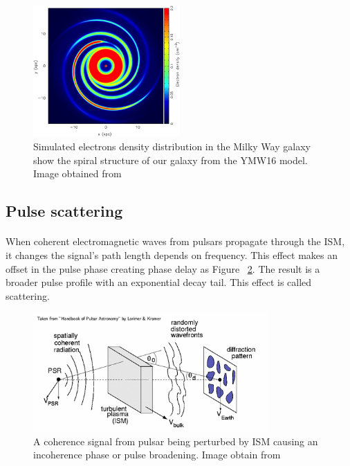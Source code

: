 \documentclass[thesis_msc.tex]{subfiles}
\begin{document}
\begin{figure}[h]
\centering
\includegraphics[width=0.5\textwidth]{figures/nedist.jpg}
\caption{Simulated electrons density distribution in the Milky Way galaxy show the spiral structure of our galaxy from the YMW16 model. Image obtained from \citep{yao2017new}  }
\label{nedist}
\end{figure}

    
    \subsection{Pulse scattering}
\paragraph{} When coherent electromagnetic waves from pulsars propagate through the ISM, it changes the signal's path length depends on frequency. This effect makes an offset in the pulse phase creating phase delay as Figure ~\ref{scatt}. The result is a broader pulse profile with an exponential decay tail. This effect is called scattering. 

 \begin{figure}[h] \centering 
\includegraphics[width=0.8\textwidth]{figures/scatt.png}
\caption{A coherence signal from pulsar being perturbed by ISM causing an incoherence phase or pulse broadening. Image obtain from \citep{handbook}  }

\label{scatt}
\end{figure}
\end{document}
